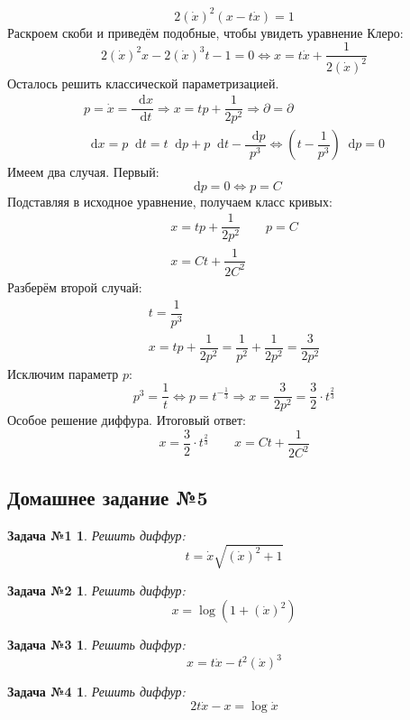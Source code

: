 \documentclass[a4paper,12pt]{article}
\newtheorem*{task1}{Задача №1}
\newtheorem*{task2}{Задача №2}
\newtheorem*{task3}{Задача №3}
\newtheorem*{task4}{Задача №4}
\renewcommand*\d{\mathop{}\!\mathrm{d}}
\newcommand{\dx}{\dot{x}}
\newcommand{\bto}{\Longrightarrow}
\begin{document}
\[2(\dx)^2 (x - t\dx) = 1\]
Раскроем скоби и приведём подобные, чтобы увидеть уравнение Клеро:
\[2(\dx)^2 x - 2(\dx)^3 t - 1 = 0 \iff x = t\dx + \dfrac{1}{2(\dx)^2}\]
Осталось решить классической параметризацией.
\begin{gather*}
	p = \dx = \dfrac{\d x}{\d t} \bto x = tp + \dfrac{1}{2p^2} \bto \partial = \partial\\
	\d x = p\d t = t\d p + p\d t - \dfrac{\d p}{p^3} \iff \left(t - \dfrac{1}{p^3}\right)\d p = 0
\end{gather*}
Имеем два случая. Первый:
\[\d p = 0 \iff p = C\]
Подставляя в исходное уравнение, получаем класс кривых:
\begin{gather*}
	x = tp + \dfrac{1}{2p^2}\qquad p = C\\
	x = Ct + \dfrac{1}{2C^2}
\end{gather*}
Разберём второй случай:
\begin{gather*}
	t = \dfrac{1}{p^3}\\
	x = tp + \dfrac{1}{2p^2} = \dfrac{1}{p^2} + \dfrac{1}{2p^2} = \dfrac{3}{2p^2}
\end{gather*}
Исключим параметр $p$:
\[p^3 = \dfrac{1}{t} \iff p = t^{-\frac{1}{3}} \bto x = \dfrac{3}{2p^2} = \dfrac{3}{2} \cdot t^{\frac 23}\]
Особое решение диффура. Итоговый ответ:
\[x = \dfrac{3}{2} \cdot t^{\frac 23} \qquad x = Ct + \dfrac{1}{2C^2}\]


\subsection{Домашнее задание №5}

\begin{task1}
	Решить диффур:
	\[t = \dx\sqrt{(\dx)^2 + 1}\]
\end{task1}
%

\begin{task2}
	Решить диффур:
	\[x = \log(1 + (\dx)^2)\]
\end{task2}
%

\begin{task3}
	Решить диффур:
	\[x = t\dx - t^2(\dx)^3\]
\end{task3}
%	

\begin{task4}
	Решить диффур:
	\[2t\dx - x = \log \dx\]
\end{task4}
%
\end{document}
